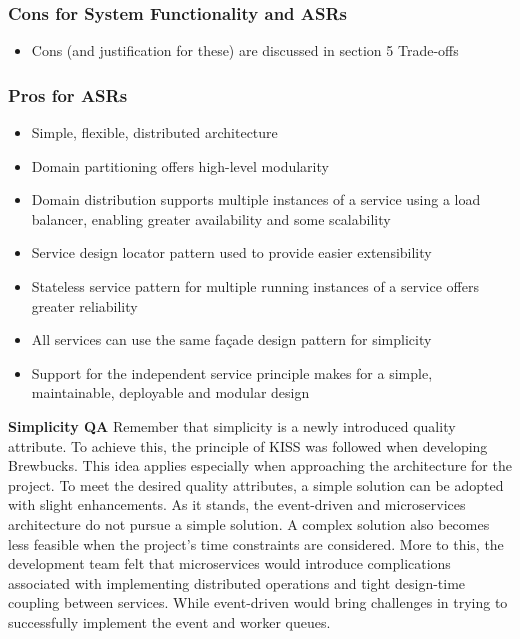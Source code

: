 \documentclass{article}
\begin{document}
\subsubsection*{Cons for System Functionality and ASRs}
\begin{itemize}
    \item Cons (and justification for these) are discussed in section 5 Trade-offs 
\end{itemize}

\subsubsection*{Pros for ASRs}
\begin{itemize}
    \item Simple, flexible, distributed architecture
    \item Domain partitioning offers high-level modularity 
    \item Domain distribution supports multiple instances of a service using a load balancer, enabling greater availability and some scalability 
    \item Service design locator pattern used to provide easier extensibility
    \item Stateless service pattern for multiple running instances of a service offers greater reliability
    \item All services can use the same façade design pattern for simplicity
    \item Support for the independent service principle makes for a simple, maintainable, deployable and modular design
\end{itemize}

\medskip \noindent \textbf{Simplicity QA}
\hfill \break Remember that simplicity is a newly introduced quality attribute. To achieve this, the principle of KISS was followed when developing Brewbucks. This idea applies especially when approaching the architecture for the project. To meet the desired quality attributes, a simple solution can be adopted with slight enhancements. As it stands, the event-driven and microservices architecture do not pursue a simple solution. A complex solution also becomes less feasible when the project's time constraints are considered. More to this, the development team felt that microservices would introduce complications associated with implementing distributed operations and tight design-time coupling between services. While event-driven would bring challenges in trying to successfully implement the event and worker queues.
\end{document}
